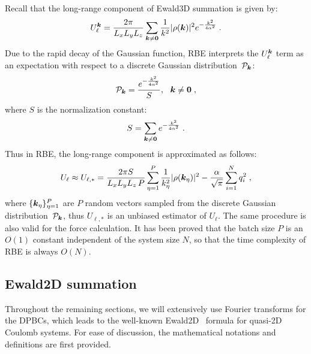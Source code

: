 
Recall that the long-range component of Ewald3D summation is given by:
\begin{equation}
	U_{\ell}^{\boldsymbol{k}} = \frac{2 \pi}{L_xL_yL_z} \sum_{\boldsymbol{k} \neq \boldsymbol{0}} \frac{1}{k^2} \lvert\rho(\boldsymbol{k})\rvert^2 e^{-\frac{k^2}{4\alpha^2}}\;.
\end{equation}
Due to the rapid decay of the Gaussian function, RBE interprets the $U_{\ell}^{\boldsymbol{k}}$ term as an expectation with respect to a discrete Gaussian distribution~$\mathcal{P}_{\boldsymbol{k}}$:
\begin{equation}
	\mathcal{P}_{\boldsymbol{k}} = \frac{e^{-\frac{k^2}{4\alpha^2}}}{S},~~\boldsymbol{k} \neq \boldsymbol{0} \;,
\end{equation}
where $S$ is the normalization constant:
\begin{equation}
	S = \sum_{\boldsymbol{k} \neq \boldsymbol{0}} e^{-\frac{k^2}{4\alpha^2}}\;.
\end{equation}
Thus in RBE, the long-range component is approximated as follows:
\begin{equation}
	U_{\ell} \approx U_{\ell, *} =  \frac{2 \pi S}{L_xL_yL_z\,P} \sum_{\eta = 1}^{P} \frac{1}{k_{\eta}^2} \lvert\rho(\boldsymbol{k}_{\eta})\rvert^2 - \frac{\alpha}{\sqrt{\pi}}\sum_{i=1}^{N}q_i^2\;,
\end{equation}
where $\{\boldsymbol{k}_{\eta}\}_{\eta=1}^{P}$ are $P$ random vectors sampled from the discrete Gaussian distribution~$\mathcal{P}_{\boldsymbol{k}}$, thus $U_{\ell, *}$ is an unbiased estimator of $U_{\ell}$.
The same procedure is also valid for the force calculation.
It has been proved that the batch size $P$ is an $O(1)$ constant independent of the system size $N$, so that the time complexity of RBE is always $O(N)$.


\subsection{Ewald2D summation} \label{sec::ewald2d}

Throughout the remaining sections, we will extensively use Fourier transforms for the DPBCs, which leads to the well-known Ewald2D~\cite{parry1975electrostatic, heyes1977molecular, de1979electrostatic} formula for quasi-2D Coulomb systems.
For ease of discussion, the mathematical notations and definitions are first provided.

